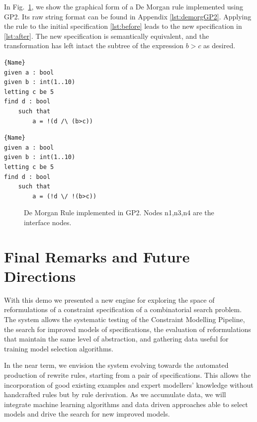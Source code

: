 \documentclass[runningheads]{llncs}
\begin{document}
In Fig.~\ref{fig:demorgan}, we show the graphical form of a De Morgan rule implemented using GP2. Its raw string format can be found in Appendix \ref{lst:demorgGP2}. Applying the rule to the initial specification \ref{lst:before} leads to the new specification in \ref{lst:after}. The new specification is semantically equivalent, and the transformation has left intact the subtree of the expression $b>c$ as desired.

\noindent\begin{minipage}{.45\textwidth}
\begin{lstlisting}[caption=Original Specification,label={lst:before},frame=tlrb]{Name}
given a : bool
given b : int(1..10)
letting c be 5
find d : bool
    such that
        a = !(d /\ (b>c))
\end{lstlisting}
\end{minipage}\hfill
\begin{minipage}{.45\textwidth}
\begin{lstlisting}[caption=Rewritten Specification,label={lst:after},frame=tlrb]{Name}
given a : bool
given b : int(1..10)
letting c be 5
find d : bool
    such that
        a = (!d \/ !(b>c))
\end{lstlisting}
\end{minipage}


\begin{figure}[htbp]
\centering
  
  \caption{De Morgan Rule implemented in GP2. Nodes n1,n3,n4 are the interface nodes.}
  \label{fig:demorgan}
\end{figure}

\section{Final Remarks and Future Directions}

With this demo we presented a new engine for exploring the space of reformulations of a constraint specification of a combinatorial search problem. The system allows the systematic testing of the Constraint Modelling Pipeline, the search for improved models of \essence specifications, the evaluation of reformulations that maintain the same level of abstraction, and gathering data useful for training model selection algorithms.

In the near term, we envision the system evolving towards the automated production of rewrite rules, starting from a pair of specifications. This allows the incorporation of good existing examples and expert modellers' knowledge without handcrafted rules but by rule derivation.
As we accumulate data, we will integrate machine learning algorithms and data driven approaches able to select models and drive the search for new improved models.
\end{document}
